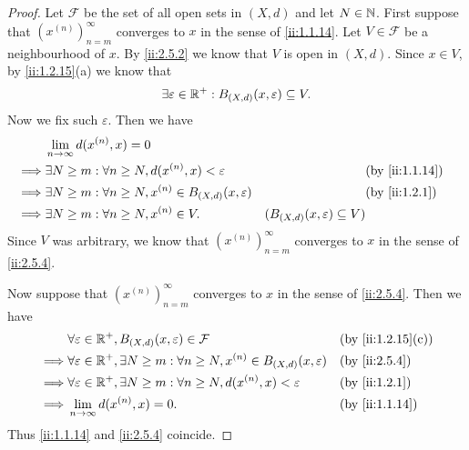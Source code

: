 \begin{proof}
  Let \(\mathcal{F}\) be the set of all open sets in \((X, d)\) and let \(N \in \mathbb{N}\).
  First suppose that \((x^{(n)})_{n = m}^\infty\) converges to \(x\) in the sense of \cref{ii:1.1.14}.
  Let \(V \in \mathcal{F}\) be a neighbourhood of \(x\).
  By \cref{ii:2.5.2} we know that \(V\) is open in \((X, d)\).
  Since \(x \in V\), by \cref{ii:1.2.15}(a) we know that
  \[
    \exists \varepsilon \in \mathbb{R}^+ : B_{(X, d)}(x, \varepsilon) \subseteq V.
  \]
  Now we fix such \(\varepsilon\).
  Then we have
  \begin{align*}
             & \lim_{n \to \infty} d(x^{(n)}, x) = 0                                                                                                   \\
    \implies & \exists N \geq m : \forall n \geq N, d(x^{(n)}, x) < \varepsilon            &                                          & \by{ii:1.1.14} \\
    \implies & \exists N \geq m : \forall n \geq N, x^{(n)} \in B_{(X, d)}(x, \varepsilon) &                                          & \by{ii:1.2.1}  \\
    \implies & \exists N \geq m : \forall n \geq N, x^{(n)} \in V.                         & (B_{(X, d)}(x, \varepsilon) \subseteq V)
  \end{align*}
  Since \(V\) was arbitrary, we know that \((x^{(n)})_{n = m}^\infty\) converges to \(x\) in the sense of \cref{ii:2.5.4}.

  Now suppose that \((x^{(n)})_{n = m}^\infty\) converges to \(x\) in the sense of \cref{ii:2.5.4}.
  Then we have
  \begin{align*}
             & \forall \varepsilon \in \R^+, B_{(X, d)}(x, \varepsilon) \in \mathcal{F}                                  &  & \by{ii:1.2.15}[c] \\
    \implies & \forall \varepsilon \in \R^+, \exists N \geq m : \forall n \geq N, x^{(n)} \in B_{(X, d)}(x, \varepsilon) &  & \by{ii:2.5.4}     \\
    \implies & \forall \varepsilon \in \R^+, \exists N \geq m : \forall n \geq N, d(x^{(n)}, x) < \varepsilon            &  & \by{ii:1.2.1}     \\
    \implies & \lim_{n \to \infty} d(x^{(n)}, x) = 0.                                                                    &  & \by{ii:1.1.14}
  \end{align*}
  Thus \cref{ii:1.1.14} and \cref{ii:2.5.4} coincide.
\end{proof}

